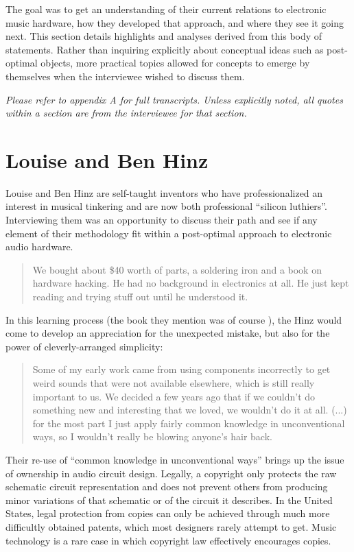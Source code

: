 The goal was to get an understanding of their current relations to electronic music hardware, how they developed that approach, and where they see it going next. This section details highlights and analyses derived from this body of statements. Rather than inquiring explicitly about conceptual ideas such as post-optimal objects, more practical topics allowed for concepts to emerge by themselves when the interviewee wished to discuss them.  

\emph{Please refer to appendix A for full transcripts. Unless explicitly noted, all quotes within a section are from the interviewee for that section.}
	
\section{Louise and Ben Hinz}

Louise and Ben Hinz are self-taught inventors who have professionalized an interest in musical tinkering and are now both professional ``silicon luthiers''. Interviewing them was an opportunity to discuss their path and see if any element of their methodology fit within a post-optimal approach to electronic audio hardware. 

\begin{quote}
	We bought about \$40 worth of parts, a soldering iron and a book on hardware hacking. He had no background in electronics at all. He just kept reading and trying stuff out until he understood it.
\end{quote}

In this learning process (the book they mention was of course \citep{collins2006}), the Hinz would come to develop an appreciation for the unexpected mistake, but also for the power of cleverly-arranged simplicity:  

\begin{quote}
	
	Some of my early work came from using components incorrectly to get weird sounds that were not available elsewhere, which is still really important to us. We decided a few years ago that if we couldn’t do something new and interesting that we loved, we wouldn’t do it at all. (...) for the most part I just apply fairly common knowledge in unconventional ways, so I wouldn’t really be blowing anyone’s hair back.
	
	\end{quote}

Their re-use of ``common knowledge in unconventional ways'' brings up the issue of ownership in audio circuit design. Legally, a copyright only protects the raw schematic circuit representation and does not prevent others from producing minor variations of that schematic or of the circuit it describes. In the United States, legal protection from copies can only be achieved through much more difficultly obtained patents, which most designers rarely attempt to get. Music technology is a rare case in which copyright law effectively encourages copies. 

